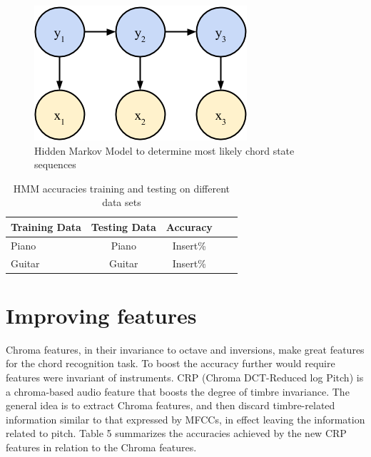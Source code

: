 \documentclass{article}
\begin{document}
\begin{figure}[ht]
\vskip 0.2in
\begin{center}
\centerline{\includegraphics[width=\columnwidth]{hmm}}
\caption{Hidden Markov Model to determine most likely chord state sequences}
\label{icml-historical}
\end{center}
\vskip -0.2in
\end{figure}

\begin{table}[t]
\caption{HMM accuracies training and testing on different data sets}
\label{hmmacc}
\vskip 0.15in
\begin{center}
\begin{small}
\begin{sc}
\begin{tabular}{lcccr}
\hline
\abovespace\belowspace
Training Data & Testing Data & Accuracy \\
\hline
\abovespace
Piano  & Piano  & Insert\%\\
Guitar & Guitar  & Insert\%\\
\hline
\end{tabular}
\end{sc}
\end{small}
\end{center}
\vskip -0.1in
\end{table}

\section{Improving features}

Chroma features, in their invariance to octave and inversions, make great features for the chord recognition task. To boost the accuracy further would require features were invariant of instruments. CRP (Chroma DCT-Reduced log Pitch) is a chroma-based audio feature that boosts the degree of timbre invariance. The general idea is to extract Chroma features, and then discard timbre-related information similar to that expressed by MFCCs, in effect leaving the information related to pitch. Table 5 summarizes the accuracies achieved by the new CRP features in relation to the Chroma features.
\end{document}
